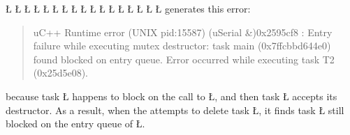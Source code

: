 \documentclass[openright,twoside]{report}
\begin{document}
\L{\LB{}}
\L{}
\L{\LB{}}
\L{\LB{\};}}
\endlgrinde\LGend
\LGinlinefalse\LGbegin\lgrinde
\L{}
\L{\LB{}}
\L{}
\L{\LB{}}
\L{}
\L{\LB{}}
\L{\LB{\};}}
\endlgrinde\LGend
\LGinlinefalse\LGbegin\lgrinde
\L{}
\L{\LB{}}
\L{\LB{}}
\L{\LB{}}
\L{\LB{}}
\L{\LB{\}}}
\endlgrinde\LGend
generates this error:
\begin{quote}
\BGfont
uC++ Runtime error (UNIX pid:15587) (uSerial \&)0x2595cf8 : Entry failure while executing mutex destructor: task main (0x7ffcbbd644e0) found blocked on entry queue.
Error occurred while executing task T2 (0x25d5e08).
\end{quote}
because task \LGinlinetrue\LGbegin\lgrinde\L{}\endlgrinde\LGend{} happens to block on the call to \LGinlinetrue\LGbegin\lgrinde\L{}\endlgrinde\LGend{}, and then task \LGinlinetrue\LGbegin\lgrinde\L{}\endlgrinde\LGend{} accepts its destructor.
As a result, when the  attempts to delete task \LGinlinetrue\LGbegin\lgrinde\L{}\endlgrinde\LGend{}, it finds task \LGinlinetrue\LGbegin\lgrinde\L{}\endlgrinde\LGend{} still blocked on the entry queue of \LGinlinetrue\LGbegin\lgrinde\L{}\endlgrinde\LGend{}.
\end{document}
